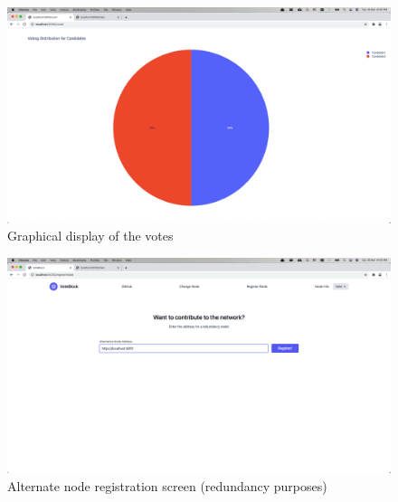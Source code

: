 \documentclass{article}
\begin{document}
    \begin{figure}[h]
        \centering
        \includegraphics[width=1\textwidth]{votes_graph.png}
        \caption{Graphical display of the votes}
    \end{figure}
    \begin{figure}[h]
        \centering
        \includegraphics[width=1\textwidth]{alternate_node_registration.png}
        \caption{Alternate node registration screen (redundancy purposes)}
    \end{figure}
\end{document}
